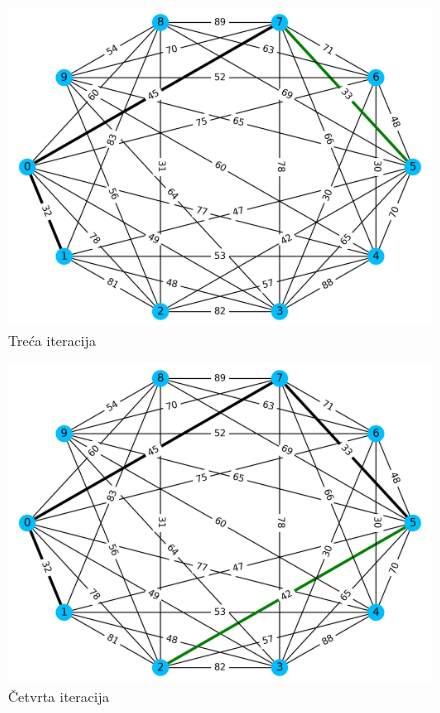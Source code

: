 \documentclass[conference]{IEEEtran}
\begin{document}
\begin{figure}[H]
\centering
\includegraphics[width=1\linewidth]{slike/300dpi/3d.jpg}
\caption{Treća iteracija}
\label{figmat}
\end{figure}

\begin{figure}[H]
\centering
\includegraphics[width=1\linewidth]{slike/300dpi/4d.jpg}
\caption{Četvrta iteracija}
\label{figmat}
\end{figure}
\end{document}
